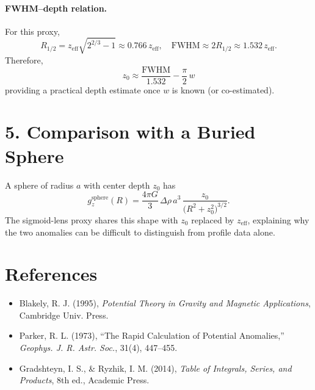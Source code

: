 \documentclass[11pt,a4paper]{article}
\begin{document}
\paragraph{FWHM--depth relation.}
For this proxy,
\[
R_{1/2} = z_{\mathrm{eff}}\sqrt{2^{2/3}-1} \approx 0.766\,z_{\mathrm{eff}},
\quad
\mathrm{FWHM} \approx 2R_{1/2} \approx 1.532\,z_{\mathrm{eff}}.
\]
Therefore,
\[
\boxed{\, z_0 \approx \frac{\mathrm{FWHM}}{1.532} - \frac{\pi}{2}\,w \,}
\]
providing a practical depth estimate once $w$ is known (or co-estimated).

\section*{5. Comparison with a Buried Sphere}

A sphere of radius $a$ with center depth $z_0$ has
\[
g_z^{\text{sphere}}(R)
=
\frac{4\pi G}{3}\,\Delta\rho\,a^3\,
\frac{z_0}{\big(R^2 + z_0^2\big)^{3/2}}.
\]
The sigmoid-lens proxy shares this shape with $z_0$ replaced by $z_{\mathrm{eff}}$, explaining why the two anomalies can be difficult to distinguish from profile data alone.

\section*{References}
\begin{itemize}
\item Blakely, R. J. (1995), \emph{Potential Theory in Gravity and Magnetic Applications}, Cambridge Univ. Press.
\item Parker, R. L. (1973), ``The Rapid Calculation of Potential Anomalies,'' \emph{Geophys. J. R. Astr. Soc.}, 31(4), 447--455.
\item Gradshteyn, I. S., \& Ryzhik, I. M. (2014), \emph{Table of Integrals, Series, and Products}, 8th ed., Academic Press.
\end{itemize}
\end{document}
